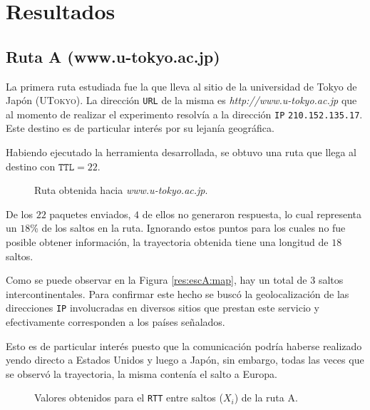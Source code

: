 \section{Resultados}

\subsection{Ruta A (www.u-tokyo.ac.jp)}

La primera ruta estudiada fue la que lleva al sitio de la
universidad de Tokyo de Japón (\textsc{UTokyo}). La dirección \texttt{URL} de la
misma es \emph{http://www.u-tokyo.ac.jp} que al momento de realizar el
experimento resolvía a la dirección \texttt{IP} \texttt{210.152.135.17}. Este
destino es de particular interés por su lejanía geográfica.

Habiendo ejecutado la herramienta desarrollada, se obtuvo una ruta que llega al
destino con $\texttt{TTL} = 22$.

\begin{figure}[H]
    \caption{Ruta obtenida hacia \emph{www.u-tokyo.ac.jp}.}
\end{figure}

De los $22$ paquetes enviados, $4$ de ellos no generaron
respuesta, lo cual representa un $18$\% de los saltos en la ruta. Ignorando
estos puntos para los cuales no fue posible obtener información, la trayectoria
obtenida tiene una longitud de $18$ saltos.

Como se puede observar en la Figura \ref{res:escA:map}, hay un total de 3 saltos
intercontinentales. Para confirmar este hecho se buscó la geolocalización de las
direcciones \texttt{IP} involucradas en diversos sitios que prestan este
servicio y efectivamente corresponden a los países señalados.

\begin{figure*}
    \caption{Localización de saltos según geolocalización de direcciones IP para
    el sitio \emph{www.u-tokyo.ac.jp}.}
    \label{res:escA:map}
\end{figure*}

Esto es de particular interés puesto que la comunicación podría haberse
realizado yendo directo a Estados Unidos y luego a Japón, sin embargo, todas las
veces que se observó la trayectoria, la misma contenía el salto a Europa.

\begin{figure}[H]
    \caption{Valores obtenidos para el \texttt{RTT} entre saltos ($X_i$) de la ruta A.}
    \label{res:escA:rtt}
\end{figure}

